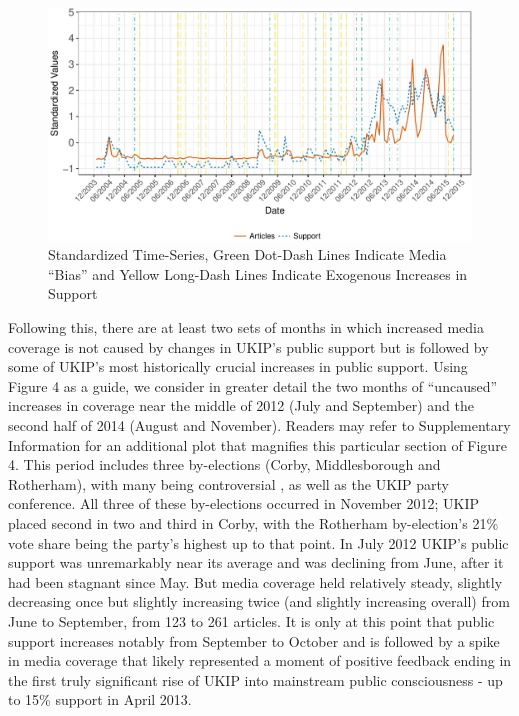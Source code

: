 \documentclass[12pt,]{article}
\makeatletter
\def\maxwidth{\ifdim\Gin@nat@width>\linewidth\linewidth
\else\Gin@nat@width\fi}
\let\Oldincludegraphics\includegraphics
\renewcommand{\includegraphics}[1]{\Oldincludegraphics[width=\maxwidth]{#1}}
\makeatother
\begin{document}
\begin{figure}[htbp]
\centering
\includegraphics{ukip_media_files/figure-latex/unnamed-chunk-9-1.pdf}
\caption{Standardized Time-Series, Green Dot-Dash Lines Indicate Media
``Bias'' and Yellow Long-Dash Lines Indicate Exogenous Increases in
Support}
\end{figure}

Following this, there are at least two sets of months in which increased
media coverage is not caused by changes in UKIP's public support but is
followed by some of UKIP's most historically crucial increases in public
support. Using Figure 4 as a guide, we consider in greater detail the
two months of ``uncaused'' increases in coverage near the middle of 2012
(July and September) and the second half of 2014 (August and November).
Readers may refer to Supplementary Information for an additional plot
that magnifies this particular section of Figure 4. This period includes
three by-elections (Corby, Middlesborough and Rotherham), with many
being controversial \citep{wainwright_rotherham_2012}, as well as the
UKIP party conference. All three of these by-elections occurred in
November 2012; UKIP placed second in two and third in Corby, with the
Rotherham by-election's 21\% vote share being the party's highest up to
that point. In July 2012 UKIP's public support was unremarkably near its
average and was declining from June, after it had been stagnant since
May. But media coverage held relatively steady, slightly decreasing once
but slightly increasing twice (and slightly increasing overall) from
June to September, from 123 to 261 articles. It is only at this point
that public support increases notably from September to October and is
followed by a spike in media coverage that likely represented a moment
of positive feedback ending in the first truly significant rise of UKIP
into mainstream public consciousness - up to 15\% support in April 2013.
\end{document}
